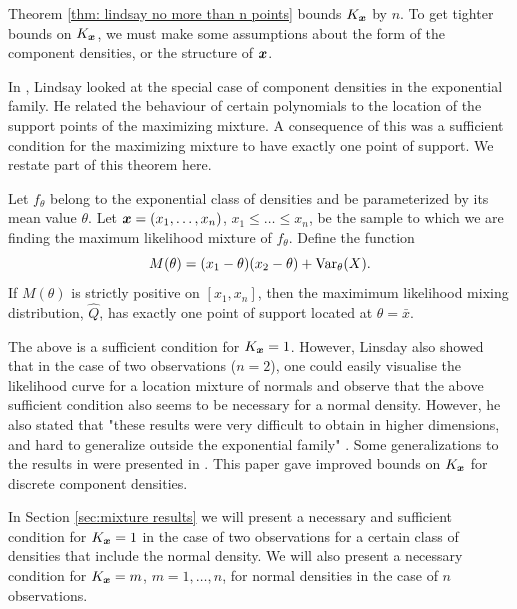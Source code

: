 	Theorem \ref{thm: lindsay no more than n points} bounds $K_{\bm{{x}}}$ by $n$. To get tighter bounds on $K_{\bm{{x}}}$, we must make some assumptions about the form of the component densities, or the structure of ${\bm{{x}}}$.

	In \cite{Lindsay1983a-he}, Lindsay looked at the special case of  component densities in the exponential family. He related the behaviour of certain polynomials to the location of the support points of the maximizing mixture. A consequence of this was a sufficient condition for the maximizing mixture to have exactly one point of support. We restate part of this theorem here.

	\begin{theorem}
	\label{thm:exponential family k=1 bound}
		Let $f_\theta$ belong to the exponential class of densities and be parameterized by its mean value $\theta$. Let ${\bm{{x}}} = (x_1, \dots, x_n)$, $x_1 \leq \dots \leq x_n$, be the sample to which we are finding the maximum likelihood mixture of $f_\theta$. Define the function
		\begin{equation}
			M(\theta) = (x_1 - \theta)(x_2 - \theta) + \mathrm{Var}_\theta(X).
		\end{equation}
		If $M(\theta)$ is strictly positive on $[x_1, x_n]$, then the maximimum likelihood mixing distribution, $\hat{Q}$, has exactly one point of support located at $\theta = \bar{x}$.
	\end{theorem}

	The above is a sufficient condition for $K_{\bm{{x}}} = 1$. However, Linsday also showed that in the case of two observations ($n=2$), one could easily visualise the likelihood curve for a location mixture of normals and observe that the above sufficient condition also seems to be necessary for a normal density. However, he also stated that "these results were very difficult to obtain in higher dimensions, and hard to generalize outside the exponential family" \cite{Lindsay1995-sq}. Some generalizations to the results in \cite{Lindsay1983a-he} were presented in \cite{Lindsay1993-rj}. This paper gave improved bounds on $K_{\bm{{x}}}$ for discrete component densities.

	In Section \ref{sec:mixture results} we will present a necessary and sufficient condition for $K_{\bm{{x}}} = 1$ in the case of two observations for a certain class of densities that include the normal density. We will also present a necessary condition for $K_{\bm{{x}}} = m$, $m = 1, \dots, n$, for normal densities in the case of $n$ observations.

